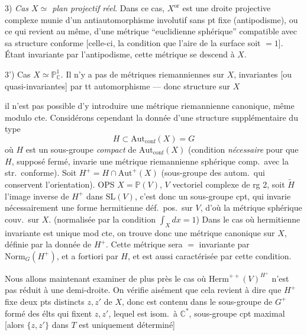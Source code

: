 \documentclass[11pt,a4paper]{article}
\begin{document}
3) \emph{Cas \struck{\ill{}} $X \simeq$  plan projectif réel}.
Dans ce  cas, $X^{\mathrm{or}}$ est une droite projective
complexe munie d'un antiautomorphisme involutif sans pt fixe
(antipodisme), ou ce qui revient au même, d'une métrique “euclidienne
sphérique” compatible avec sa structure conforme [celle-ci, \struck{\ill{}}
 la condition que l'aire de
la surface soit $= 1$]. Étant invariante par l'antipodisme, cette métrique se
descend à $X$.

3') Cas $X \simeq \mathbb{P}^{1}_{\mathbb{C}}$. Il n'y a pas de métriques
riemanniennes sur $X$, invariantes [ou quasi-invariantes] par tt
automorphisme — donc  structure 
sur $X$


il n'est pas possible d'y introduire une métrique riemannienne canonique,
même modulo cte. Considérons cependant la donnée d'une structure
supplémentaire du type
\[
  H \subset \mathrm{Aut}_{\mathrm{conf}}(X) = G
\]
où $H$ est un sous-groupe \emph{compact} de
$\mathrm{Aut}_{\mathrm{conf}}(X)$ (condition \emph{nécessaire} pour que $H$,
supposé fermé, invarie une métrique riemannienne sphérique comp.\ avec la
str.\ conforme). Soit $H^{+} = H \cap \mathrm{Aut}^{+}(X)$ (sous-groupe des
autom.\ qui conservent l'orientation). OPS $X = \mathbb{P}(V)$, $V$ vectoriel
complexe de rg 2, \struck{\ill{}} soit $\widetilde{H}$ l'image inverse de
$H^{+}$ dans $\mathrm{SL}(V)$, c'est donc un sous-groupe cpt, qui invarie
nécessairement une forme hermitienne déf.\ pos.\ sur $V$, d'où la métrique
sphérique couv.\ sur $X$. (normalisée par la condition
$\int_{X} dx = 1$) Dans le cas où  
 hermitienne invariante est unique mod cte, on trouve
donc une métrique  canonique sur $X$, définie par
la  donnée de $H^{+}$. Cette métrique sera $=$ invariante par
$\mathrm{Norm}_{G}(H^{+})$, et a fortiori par $H$, et est aussi
caractérisée par cette condition.


Nous allons maintenant examiner de plus près le cas où \struck{\ill{}}
$\mathrm{Herm}^{++}(V)^{H^{+}}$ n'est pas réduit à une demi-droite. On
vérifie aisément que cela revient à dire que $H^{+}$ \struck{\ill{}} fixe
deux pts distincts $z, z'$ de $X$, donc est contenu dans le sous-groupe de
$G^{+}$  formé des élts qui fixent $z, z'$, lequel est isom.\
à $\mathbb{C}^{*}$, \struck{\ill{}} 
sous-groupe cpt maximal \add{$T$ isom.\ à $\mathbb{U}$}
[alors $\{z, z'\}$ dans $T$ est uniquement déterminé]
\end{document}
